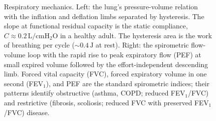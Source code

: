 \begin{figure}[htbp]
\caption{Respiratory mechanics. Left: the lung's pressure-volume
relation with the inflation and deflation limbs separated by
hysteresis. The slope at functional residual capacity is the static
compliance, $C \approx 0.2\,\text{L}/\text{cmH}_2\text{O}$ in a
healthy adult. The hysteresis area is the work of breathing per cycle
($\sim 0.4\,\text{J}$ at rest). Right: the spirometric flow-volume
loop with the rapid rise to peak expiratory flow (PEF) at small
expired volume followed by the effort-independent descending limb.
Forced vital capacity (FVC), forced expiratory volume in one second
(FEV$_1$), and PEF are the standard spirometric indices; their
patterns identify obstructive (asthma, COPD; reduced FEV$_1$/FVC) and
restrictive (fibrosis, scoliosis; reduced FVC with preserved
FEV$_1$/FVC) disease.}
\label{fig:vol06ch06:resp-mech}
\end{figure}
